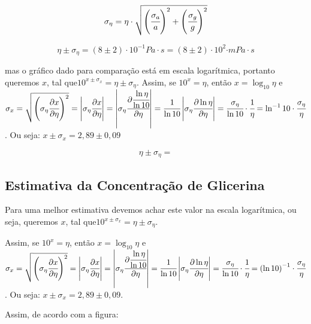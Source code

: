 \documentclass[english,brazil]{article}
\begin{document}
			\begin{equation}
				\sigma_{\eta} = \eta\cdot\sqrt{\left(\cfrac{\sigma_{a}}{a}\right)^{2}+\left(\cfrac{\sigma_{g}}{g}\right)^{2}}
			\end{equation}


			\begin{equation}
				\eta\pm\sigma_{\eta}=\left(8\pm2\right)\cdot10^{-1}\unit{Pa\cdot s=\left(8\pm2\right)\cdot10^{2}\unit{\cdot mPa\cdot s}}
			\end{equation}


			mas o gráfico dado para comparação está em escala logarítmica, portanto
			queremos $x$, tal que$10^{x\pm\sigma_{x}}=\eta\pm\sigma_{\eta}$.
			Assim, se $10^{x}=\eta$, então $x=\log_{10}\eta$ e $\sigma_{x}=\sqrt{\left(\sigma_{\eta}\cfrac{\partial x}{\partial\eta}\right)^{2}}=\left|\sigma_{\eta}\cfrac{\partial x}{\partial\eta}\right|=\left|\sigma_{\eta}\cfrac{\partial\cfrac{\ln\eta}{\ln10}}{\partial\eta}\right|=\cfrac{1}{\ln10}\left|\sigma_{\eta}\cfrac{\partial\ln\eta}{\partial\eta}\right|=\cfrac{\sigma_{\eta}}{\ln10}\cdot\cfrac{1}{\eta}=\ln^{-1}10\cdot\cfrac{\sigma_{\eta}}{\eta}$.
			Ou seja: $x\pm\sigma_{x}=2,89\pm0,09$

			$$\eta\pm\sigma_{\eta}=$$


		\subsection{Estimativa da Concentração de Glicerina}
		
			Para uma melhor estimativa devemos achar este valor na escala logarítmica, ou seja, queremos $x$, tal que$10^{x\pm\sigma_{x}}=\eta\pm\sigma_{\eta}$.

			Assim, se $10^{x}=\eta$, então $x=\log_{10}\eta$ e $\sigma_{x}=\sqrt{\left(\sigma_{\eta}\cfrac{\partial x}{\partial\eta}\right)^{2}}=\left|\sigma_{\eta}\cfrac{\partial x}{\partial\eta}\right|=\left|\sigma_{\eta}\cfrac{\partial\cfrac{\ln\eta}{\ln10}}{\partial\eta}\right|=\cfrac{1}{\ln10}\left|\sigma_{\eta}\cfrac{\partial\ln\eta}{\partial\eta}\right|=\cfrac{\sigma_{\eta}}{\ln10}\cdot\cfrac{1}{\eta}=\left(\ln10\right)^{-1}\cdot\cfrac{\sigma_{\eta}}{\eta}$.
			Ou seja: $x\pm\sigma_{x}=2,89\pm0,09$.

			Assim, de acordo com a figura:
\end{document}
